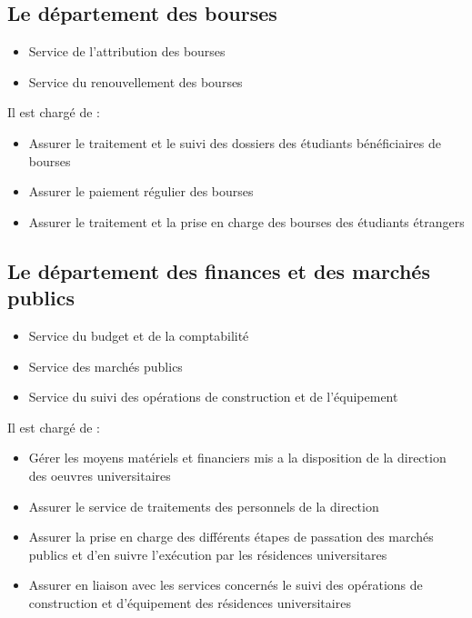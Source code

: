     \subsection{Le département des bourses}
        \begin{itemize}
            \item Service de l'attribution des bourses
            \item Service du renouvellement des bourses\\
        \end{itemize}

        Il est chargé de :
        \begin{itemize}\renewcommand{\labelitemi}{$\bullet$}
            \item Assurer le traitement et le suivi des dossiers des étudiants bénéficiaires de bourses
            \item Assurer le paiement régulier des bourses
            \item Assurer le traitement et la prise en charge des bourses des étudiants étrangers
        \end{itemize}

    \subsection{Le département des finances et des marchés publics}
        \begin{itemize}
            \item Service du budget et de la comptabilité
            \item Service des marchés publics
            \item Service du suivi des opérations de construction et de l'équipement\\
        \end{itemize}

        Il est chargé de :
        \begin{itemize}\renewcommand{\labelitemi}{$\bullet$}
            \item Gérer les moyens matériels et financiers mis a la disposition de la direction des oeuvres universitaires
            \item Assurer le service de traitements des personnels de la direction
            \item Assurer la prise en charge des différents étapes de passation des marchés publics et d'en suivre l'exécution par les résidences universitares
            \item Assurer en liaison avec les services concernés le suivi des  opérations de construction et d'équipement des résidences universitaires
        \end{itemize}

